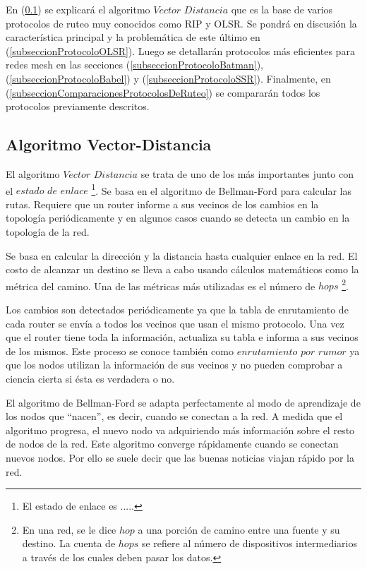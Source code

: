 En (\ref{subseccionAlgoritmoVectorDistancia}) se explicará el algoritmo $Vector$ $Distancia$ que es la base de varios protocolos de ruteo muy conocidos como RIP y OLSR. Se pondrá en discusión la característica principal y la problemática de este último en (\ref{subseccionProtocoloOLSR}). Luego se detallarán protocolos más eficientes para redes mesh en las secciones (\ref{subseccionProtocoloBatman}), (\ref{subseccionProtocoloBabel}) y (\ref{subseccionProtocoloSSR}). Finalmente, en (\ref{subseccionComparacionesProtocolosDeRuteo}) se compararán todos los protocolos previamente descritos.

\subsection{Algoritmo Vector-Distancia}
\label{subseccionAlgoritmoVectorDistancia}

El algoritmo $Vector$ $Distancia$ se trata de uno de los más importantes junto con el $estado$ $de$ $enlace$ \footnote{El estado de enlace es .....}. Se basa en el algoritmo de Bellman-Ford para calcular las rutas. Requiere que un router informe a sus vecinos de los cambios en la topología periódicamente y en algunos casos cuando se detecta un cambio en la topología de la red.

Se basa en calcular la dirección y la distancia hasta cualquier enlace en la red. El costo de alcanzar un destino se lleva a cabo usando cálculos matemáticos como la métrica del camino. Una de las métricas más utilizadas es el número de $hops$ \footnote{En una red, se le dice $hop$ a una porción de camino entre una fuente y su destino. La cuenta de $hops$ se refiere al número de dispositivos intermediarios a través de los cuales deben pasar los datos.}.

Los cambios son detectados periódicamente ya que la tabla de enrutamiento de cada router se envía a todos los vecinos que usan el mismo protocolo. Una vez que el router tiene toda la información, actualiza su tabla e informa a sus vecinos de los mismos. Este proceso se conoce también como $enrutamiento$ $por$ $rumor$ ya que los nodos utilizan la información de sus vecinos y no pueden comprobar a ciencia cierta si ésta es verdadera o no.

El algoritmo de Bellman-Ford se adapta perfectamente al modo de aprendizaje de los nodos que “nacen”, es decir, cuando se conectan a la red. A medida que el algoritmo progresa, el nuevo nodo va adquiriendo más información sobre el resto de nodos de la red. Este algoritmo converge rápidamente cuando se conectan nuevos nodos. Por ello se suele decir que las buenas noticias viajan rápido por la red.

